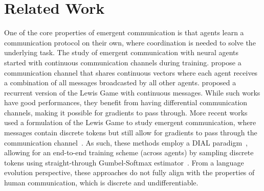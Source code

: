 \section{Related Work}
\label{app:rw}
One of the core properties of emergent communication is that agents learn a communication protocol on their own, where coordination is needed to solve the underlying task. The study of emergent communication with neural agents started with continuous communication channels during training. \citet{sukhbaatar2016learning} propose a communication channel that shares continuous vectors where each agent receives a combination of all messages broadcasted by all other agents. \citet{jorge2016learning} proposed a recurrent version of the Lewis Game with continuous messages. While such works have good performances, they benefit from having differential communication channels, making it possible for gradients to pass through. More recent works used a formulation of the Lewis Game to study emergent communication, where messages contain discrete tokens but still allow for gradients to pass through the communication channel~\citet{havrylov2017emergence,mordatch2018emergence,guo2019emergence,chaabouni-etal-2020-compositionality,rita2022on}. As such, these methods employ a DIAL paradigm~\citep{foerster2016learning}, allowing for an end-to-end training scheme (across agents) by sampling discrete tokens using straight-through Gumbel-Softmax estimator~\citep{jang2016categorical}. From a language evolution perspective, these approaches do not fully align with the properties of human communication, which is discrete and undifferentiable.


